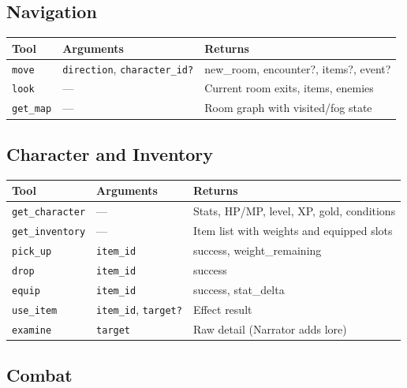 \documentclass[a4paper,10pt]{article}
\newcommand{\tool}[1]{\texttt{#1}}
\newcommand{\field}[1]{\texttt{#1}}
\begin{document}
\subsection{Navigation}

\begin{center}
\begin{tabular}{lp{4cm}p{5cm}}
\toprule
\textbf{Tool} & \textbf{Arguments} & \textbf{Returns} \\
\midrule
\tool{move}
  & \field{direction}, \field{character\_id?}
  & new\_room, encounter?, items?, event? \\
\tool{look}
  & ---
  & Current room exits, items, enemies \\
\tool{get\_map}
  & ---
  & Room graph with visited/fog state \\
\bottomrule
\end{tabular}
\end{center}

\subsection{Character and Inventory}

\begin{center}
\begin{tabular}{lp{4cm}p{5cm}}
\toprule
\textbf{Tool} & \textbf{Arguments} & \textbf{Returns} \\
\midrule
\tool{get\_character} & --- & Stats, HP/MP, level, XP, gold, conditions \\
\tool{get\_inventory} & --- & Item list with weights and equipped slots \\
\tool{pick\_up}   & \field{item\_id}  & success, weight\_remaining \\
\tool{drop}       & \field{item\_id}  & success \\
\tool{equip}      & \field{item\_id}  & success, stat\_delta \\
\tool{use\_item}  & \field{item\_id}, \field{target?} & Effect result \\
\tool{examine}    & \field{target}    & Raw detail (Narrator adds lore) \\
\bottomrule
\end{tabular}
\end{center}

\subsection{Combat}
\end{document}
